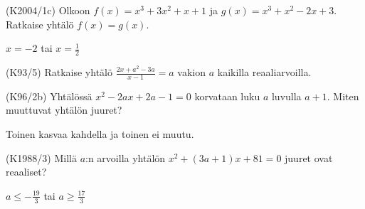 \begin{tehtava}
(K2004/1c) Olkoon $f(x)=x^3+3x^2+x+1$ ja $g(x)=x^3+x^2-2x+3$. Ratkaise yhtälö $f(x)=g(x)$.
\begin{vastaus}
$x=-2$ tai $x=\frac{1}{2}$  
\end{vastaus}
\end{tehtava}

\begin{tehtava}
(K93/5) Ratkaise yhtälö
        $\frac{2x+a^2-3a}{x-1}=a$ vakion $a$ kaikilla reaaliarvoilla.
\begin{vastaus}
    \end{vastaus}
\end{tehtava}

\begin{tehtava}
(K96/2b) Yhtälössä $x^2-2ax+2a-1=0$ korvataan luku $a$ luvulla $a+1$. Miten muuttuvat yhtälön juuret?
\begin{vastaus}
     Toinen kasvaa kahdella ja toinen ei muutu.
    \end{vastaus}
\end{tehtava}

\begin{tehtava}
(K1988/3) Millä $a$:n arvoilla yhtälön $x^2+(3a+1)x+81=0$ juuret ovat reaaliset?
\begin{vastaus}
$a \leq -\frac{19}{3}$ tai $a \geq \frac{17}{3}$
\end{vastaus}
\end{tehtava}

